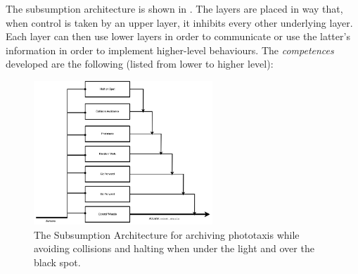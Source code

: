 The subsumption architecture is shown in . The layers are
placed in way that, when control is taken by an upper layer, it inhibits every
other underlying layer. Each layer can then use lower layers in order to
communicate or use the latter's information in order to implement higher-level
behaviours.
The \emph{competences} developed are the following (listed from lower to higher level):
%
\begin{figure}[ht]
    \centering
    \includegraphics[width=0.6\textwidth]{figures/sub-arch.jpg}
    \caption{The Subsumption Architecture for archiving phototaxis while
        avoiding collisions and halting when under the light and over the black
        spot.}
    \label{fig:sub-arch}
\end{figure}
%
